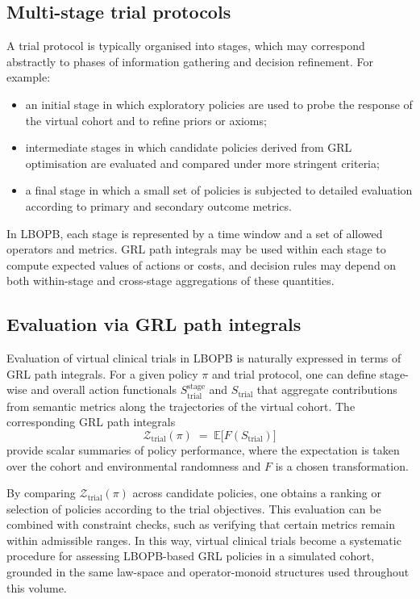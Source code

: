 \documentclass[11pt]{book}
\theoremstyle{plain}
\theoremstyle{definition}
\theoremstyle{remark}
\begin{document}
\subsection*{Multi-stage trial protocols}

A trial protocol is typically organised into stages, which may
correspond abstractly to phases of information gathering and decision
refinement. For example:

\begin{itemize}
  \item an initial stage in which exploratory policies are used to
        probe the response of the virtual cohort and to refine
        priors or axioms;
  \item intermediate stages in which candidate policies derived from
        GRL optimisation are evaluated and compared under more
        stringent criteria;
  \item a final stage in which a small set of policies is subjected
        to detailed evaluation according to primary and secondary
        outcome metrics.
\end{itemize}

In LBOPB, each stage is represented by a time window and a set of
allowed operators and metrics. GRL path integrals may be used within
each stage to compute expected values of actions or costs, and
decision rules may depend on both within-stage and cross-stage
aggregations of these quantities.

\subsection*{Evaluation via GRL path integrals}

Evaluation of virtual clinical trials in LBOPB is naturally expressed
in terms of GRL path integrals. For a given policy $\pi$ and trial
protocol, one can define stage-wise and overall action functionals
$S_{\mathrm{trial}}^{\mathrm{stage}}$ and $S_{\mathrm{trial}}$ that
aggregate contributions from semantic metrics along the trajectories
of the virtual cohort. The corresponding GRL path integrals
\[
  \mathcal{Z}_{\mathrm{trial}}(\pi)
  \;=\;
  \mathbb{E}\bigl[ F(S_{\mathrm{trial}}) \bigr]
\]
provide scalar summaries of policy performance, where the expectation
is taken over the cohort and environmental randomness and $F$ is a
chosen transformation.

By comparing $\mathcal{Z}_{\mathrm{trial}}(\pi)$ across candidate
policies, one obtains a ranking or selection of policies according to
the trial objectives. This evaluation can be combined with constraint
checks, such as verifying that certain metrics remain within admissible
ranges. In this way, virtual clinical trials become a systematic
procedure for assessing LBOPB-based GRL policies in a simulated cohort,
grounded in the same law-space and operator-monoid structures used
throughout this volume.
\end{document}
